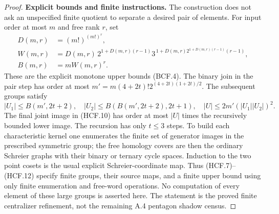 \begin{proof}
\par\medskip\noindent\textbf{Explicit bounds and finite instructions.}\quad
The construction does not ask an unspecified finite
quotient to separate a desired pair of elements.
For input order at most $m$ and free rank $r$, set
\[
\begin{aligned}
 D(m,r)&=(m!)^{(m!)^r},\\
 W(m,r)&=D(m,r)\,2^{1+D(m,r)(r-1)}
       3^{\,1+D(m,r)2^{1+D(m,r)(r-1)}(r-1)},\\
 B(m,r)&=mW(m,r)^r.
\end{aligned}                                                   \tag{HCF.11}
\]
These are the explicit monotone upper bounds (BCF.4).
The binary join in the pair step has order at most
$m'=m(4+2t)!2^{(4+2t)(1+2t)/2}$.
The subsequent groups satisfy
\[
 |U_1|\leq B(m',2t+2),\quad
 |U_2|\leq B(B(m',2t+2),2t+1),\quad
 |U|\leq2m'(|U_1||U_2|)^2.                              \tag{HCF.12}
\]
The final joint image in (HCF.10) has order at most
$|U|$ times the recursively bounded lower image.
The recursion has only $t\leq3$ steps.
To build each characteristic kernel one enumerates the
finite set of generator images in the prescribed symmetric
group; the free homology covers are then the ordinary
Schreier graphs with their binary or ternary cycle spaces.
Induction to the two point cosets is the usual explicit
Schreier-coordinate map.  Thus (HCF.7)--(HCF.12) specify
finite groups, their source maps, and a finite upper bound
using only finite enumeration and free-word operations.
No computation of every element of these large groups is
asserted here.  The statement is the proved finite
centralizer refinement, not the remaining A.4 pentagon
shadow census.
\end{proof}
